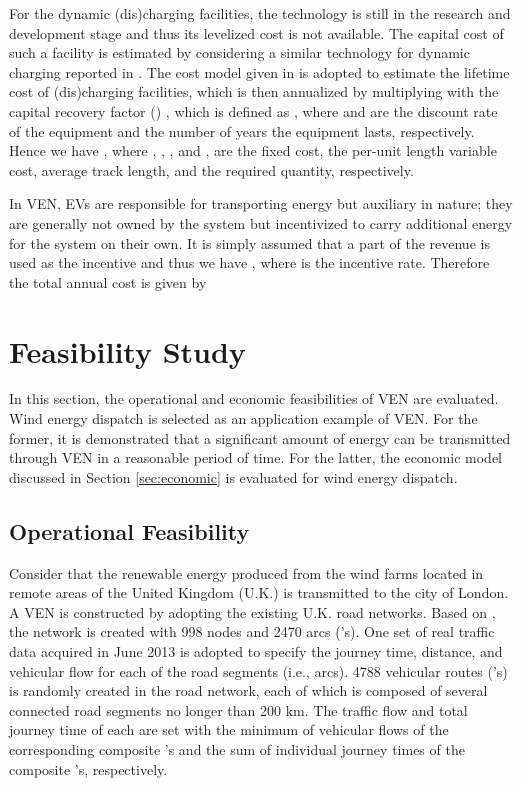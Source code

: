 \documentclass[journal]{IEEEtran}
\begin{document}
For the dynamic (dis)charging facilities, the technology is still in the research and development stage and thus its levelized cost is not available. The capital cost of such a facility is estimated by considering a similar technology for dynamic charging reported in \cite{EconDCEV}. The cost model given in \cite{EconDCEV} is adopted to estimate the lifetime cost of (dis)charging facilities, which is then annualized by multiplying with the capital recovery factor () \cite{V2Grevenue}, which is defined as , where  and  are the discount rate of the equipment and the number of years the equipment lasts, respectively. Hence we have , where , , , and  , are the fixed cost, the per-unit length variable cost, average track length, and the required quantity, respectively. 

In VEN, EVs are responsible for transporting energy but auxiliary in nature; they are generally not owned by the system but incentivized to carry additional energy for the system on their own. It is simply assumed that a part of the revenue is used as the incentive and thus we have , where  is the incentive rate. Therefore the total annual cost is given by





\section{Feasibility Study} \label{sec:simulation}


In this section, the operational and economic feasibilities of VEN are evaluated. Wind energy dispatch is selected as an application example of VEN. For the former,  it is demonstrated that a significant amount of energy can be transmitted through VEN in a reasonable period of time. For the latter, the economic model discussed in Section \ref{sec:economic} is evaluated for wind energy dispatch.

\subsection{Operational Feasibility} \label{subsec:operational}
Consider that the renewable energy produced from the wind farms located in remote areas of the United Kingdom (U.K.) is transmitted to the city of London.  A VEN is constructed by adopting the existing U.K. road networks.  Based on \cite{ukroads}, the network is created with 998 nodes and 2470 arcs ('s). One set of real traffic data acquired in June 2013 is adopted to specify the journey time, distance, and vehicular flow for each of the road segments (i.e., arcs). 4788 vehicular routes ('s) is randomly created in the road network, each of  which is composed of several connected road segments  no longer than 200 km. The traffic flow and total journey time of each  are set with the minimum of vehicular flows of the corresponding composite 's and the sum of individual journey times of the composite 's, respectively.
\end{document}
